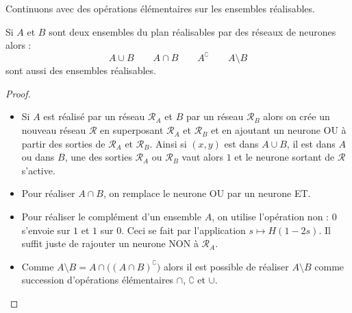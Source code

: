 \documentclass[11pt,class=report,crop=false]{standalone}
\begin{document}
Continuons avec des opérations élémentaires sur les ensembles réalisables.
\begin{proposition}
Si $A$ et $B$ sont deux ensembles du plan réalisables par des réseaux de neurones alors :
$$A\cup B \qquad A\cap B \qquad A^\complement  \qquad A \setminus B$$
sont aussi des ensembles réalisables. 
\end{proposition}




\begin{proof}
~
\begin{itemize}
  \item Si $A$ est réalisé par un réseau $\mathcal{R}_A$ et $B$ par un réseau  $\mathcal{R}_B$
alors on crée un nouveau réseau $\mathcal{R}$ en superposant $\mathcal{R}_A$ et $\mathcal{R}_B$
et en ajoutant un neurone \og{}OU\fg{} à partir des sorties de $\mathcal{R}_A$ et $\mathcal{R}_B$.
Ainsi si $(x,y)$ est dans $A \cup B$, il est dans $A$ ou dans $B$, une des sorties  $\mathcal{R}_A$ ou $\mathcal{R}_B$ vaut alors $1$ et le neurone sortant de $\mathcal{R}$ s'active.



  \item Pour réaliser $A \cap B$, on remplace le neurone \og{}OU\fg{} par un neurone \og{}ET\fg{}.


  \item Pour réaliser le complément d'un ensemble $A$, on utilise l'opération \og{}non\fg{} : $0$ s'envoie sur $1$ et $1$ sur $0$. Ceci se fait par l'application 
  $s \mapsto H(1-2s)$. Il suffit juste de rajouter un neurone \og{}NON\fg{} à $\mathcal{R}_A$.
 
  
  \item Comme $A \setminus B = A \cap \big((A\cap B)^\complement \big)$ alors 
  il est possible de réaliser $A \setminus B$ comme succession d'opérations élémentaires $\cap$, $\complement$ et $\cup$.
\end{itemize}


\end{proof}

\end{document}
